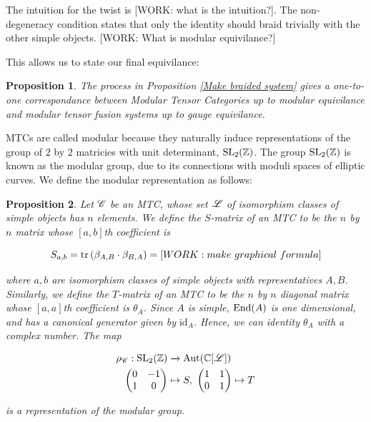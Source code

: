 \documentclass{article}
\newtheorem{proposition}{Proposition}[section]
\theoremstyle{definition}
\numberwithin{figure}{section}
\begin{document}
The intuition for the twist is [WORK: what is the intuition?]. The non-degeneracy condition states that only the identity should braid trivially with the other simple objects. [WORK: What is modular equivilance?]

This allows us to state our final equivilance:

\begin{proposition} The process in Proposition \ref{Make braided system} gives a one-to-one correspondance between Modular Tensor Categories up to modular equivilance and modular tensor fusion systems up to gauge equivilance.
\end{proposition}

MTCs are called modular because they naturally induce representations of the group of $2$ by $2$ matricies with unit determinant, $\mathrm{SL}_2(\mathbb{Z})$. The group $\mathrm{SL}_2(\mathbb{Z})$ is known as the modular group, due to its connections with moduli spaces of elliptic curves. We define the modular representation as follows:

\begin{proposition} Let $\mathscr{C}$ be an MTC, whose set $\mathscr{L}$ of isomorphism classes of simple objects has $n$ elements. We define the $S$-matrix of an MTC to be the $n$ by $n$ matrix whose $[a,b]$th coefficient is

$$S_{a,b}=\mathrm{tr}\left(\beta_{A,B}\cdot \beta_{B,A}\right)=[WORK: make \,\, graphical \,\, formula]$$

where $a,b$ are isomorphism classes of simple objects with representatives $A,B$. Similarly, we define the $T$-matrix of an MTC to be the $n$ by $n$ diagonal matrix whose $[a,a]$th coefficient is $\theta_A$. Since $A$ is simple, $\mathrm{End}(A)$ is one dimensional, and has a canonical generator given by $\text{id}_A$. Hence, we can identity $\theta_A$ with a complex number. The map

\begin{align*}
\rho_{\mathscr{C}}: \mathrm{SL}_2(\mathbb{Z})&\xrightarrow{} \mathrm{Aut}(\mathbb{C}[\mathscr{L}])\\
\begin{pmatrix}
0 & -1\\
1 & 0
\end{pmatrix}
&\mapsto S,\,\, 
\begin{pmatrix}
1 & 1\\
0 & 1
\end{pmatrix}
\mapsto T
\end{align*}

is a representation of the modular group.
\end{proposition}
\end{document}
